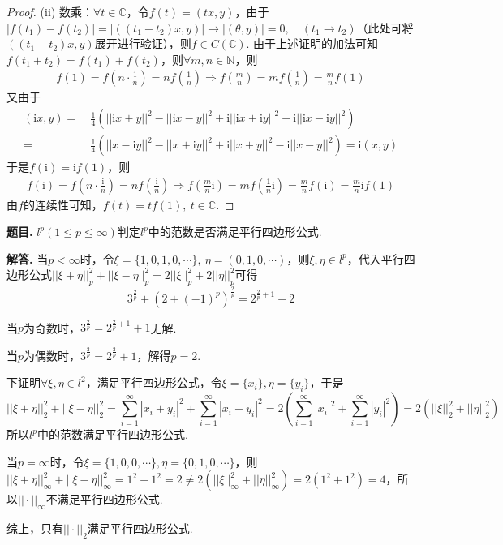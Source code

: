 \documentclass[12pt, a4paper, oneside]{ctexart}
\newcounter{problem}  %
\newenvironment{problem}[1][]{\stepcounter{problem}\par\noindent\textbf{题目\arabic{problem}. #1}}{\smallskip\par}
\newenvironment{solution}[1][]{\par\noindent\textbf{#1解答. }}{\smallskip\par}  %
\let\leq=\leqslant %
\def\N{\mathbb{N}}          %
\def\C{\mathbb{C}}          %
\def\i{\mathrm{i}}          %
\begin{document}
\begin{proof}
    (ii) 数乘：$\forall t\in \C$，令$f(t) = (tx,y)$，由于$|f(t_1)-f(t_2)| = |((t_1-t_2)x,y)|\to |(\theta,y)|=0,\quad(t_1\to t_2)$（此处可将$((t_1-t_2)x,y)$展开进行验证），则$f\in C(\C)$. 由于上述证明的加法可知$f(t_1+t_2) = f(t_1)+f(t_2)$，则$\forall m, n\in \N$，则
    \begin{align*}
        f(1) = f(n\cdot\frac{1}{n}) = nf(\frac{1}{n})\Rightarrow f(\frac{m}{n})=mf(\frac{1}{n}) = \frac{m}{n}f(1)
    \end{align*}
    又由于
    \begin{align*}
        (\i x,y) =&\ \frac{1}{4}(||\i x+y||^2-||\i x-y||^2+\i||\i x+\i y||^2-\i||\i x-\i y||^2)\\
        =&\ \frac{1}{4}(||x-\i y||^2-||x+\i y||^2+\i ||x+y||^2-\i ||x-y||^2)=\i(x, y)
    \end{align*}
    于是$f(\i) = \i f(1)$，则
    \begin{align*}
        f(\i) = f(n\cdot \frac{\i}{n}) = nf(\frac{\i}{n})\Rightarrow f(\frac{m}{n}\i)=m f(\frac{1}{n}\i) = \frac{m}{n}f(\i)=\frac{m}{n}\i f(1)
    \end{align*}
    由$f$的连续性可知，$f(t) = tf(1),\ t\in \C$.
\end{proof}
\begin{problem}
    $l^p(1\leq p\leq \infty)$判定$l^p$中的范数是否满足平行四边形公式.
\end{problem}
\begin{solution}
    当$p<\infty$时，令$\xi = \{1,0,1,0,\cdots\},\ \eta = (0,1,0,\cdots)$，则$\xi,\eta\in l^p$，代入平行四边形公式$||\xi+\eta||_p^2+||\xi-\eta||_p^2 = 2||\xi||_p^2+2||\eta||_p^2$可得
    \begin{equation*}
        3^{\frac{2}{p}}+\left(2+(-1)^p\right)^{\frac{2}{p}} = 2^{\frac{2}{p}+1}+2
    \end{equation*}

    当$p$为奇数时，$3^{\frac{2}{p}} = 2^{\frac{2}{p}+1}+1$无解.

    当$p$为偶数时，$3^{\frac{2}{p}}=2^{\frac{2}{p}}+1$，解得$p=2$.

    下证明$\forall \xi,\eta\in l^2$，满足平行四边形公式，令$\xi = \{x_i\}, \eta = \{y_i\}$，于是
    \begin{equation*}
        ||\xi+\eta||_2^2+||\xi-\eta||_2^2=\sum_{i=1}^\infty|x_i+y_i|^2+\sum_{i=1}^\infty|x_i-y_i|^2 = 2\left(\sum_{i=1}^\infty|x_i|^2+\sum_{i=1}^\infty|y_i|^2\right)=2(||\xi||_2^2+||\eta||_2^2)
    \end{equation*}
    所以$l^p$中的范数满足平行四边形公式.

    当$p=\infty$时，令$\xi = \{1,0,0,\cdots\}, \eta = \{0, 1, 0,\cdots\}$，则$||\xi+\eta||_{\infty}^2 + ||\xi-\eta||_{\infty}^2 = 1^2+1^2 = 2\neq 2(||\xi||_{\infty}^2+||\eta||_{\infty}^2)=2(1^2+1^2)=4$，所以$||\cdot||_{\infty}$不满足平行四边形公式.

    综上，只有$||\cdot||_2$满足平行四边形公式.
\end{solution}
\end{document}
